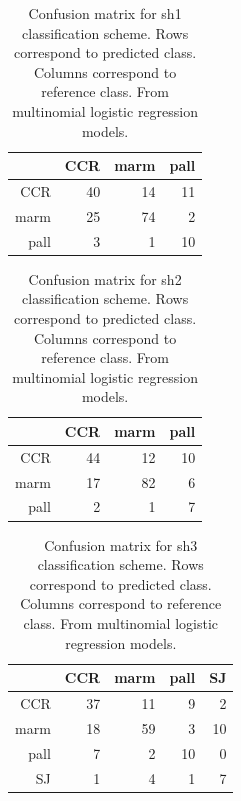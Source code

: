 \documentclass{article}\usepackage{graphicx, color}
\begin{document}
\begin{table}[ht]
\begin{center}
\begin{tabular}{rrrr}
  \hline
 & CCR & marm & pall \\ 
  \hline
CCR &  40 &  14 &  11 \\ 
  marm &  25 &  74 &   2 \\ 
  pall &   3 &   1 &  10 \\ 
   \hline
\end{tabular}
\caption{Confusion matrix for sh1 classification scheme. Rows correspond to predicted class. Columns correspond to reference class. From multinomial logistic regression models.}
\label{tab:multi-conf-sh1}
\end{center}
\end{table}
\begin{table}[ht]
\begin{center}
\begin{tabular}{rrrr}
  \hline
 & CCR & marm & pall \\ 
  \hline
CCR &  44 &  12 &  10 \\ 
  marm &  17 &  82 &   6 \\ 
  pall &   2 &   1 &   7 \\ 
   \hline
\end{tabular}
\caption{Confusion matrix for sh2 classification scheme. Rows correspond to predicted class. Columns correspond to reference class. From multinomial logistic regression models.}
\label{tab:multi-conf-sh2}
\end{center}
\end{table}
\begin{table}[ht]
\begin{center}
\begin{tabular}{rrrrr}
  \hline
 & CCR & marm & pall & SJ \\ 
  \hline
CCR &  37 &  11 &   9 &   2 \\ 
  marm &  18 &  59 &   3 &  10 \\ 
  pall &   7 &   2 &  10 &   0 \\ 
  SJ &   1 &   4 &   1 &   7 \\ 
   \hline
\end{tabular}
\caption{Confusion matrix for sh3 classification scheme. Rows correspond to predicted class. Columns correspond to reference class. From multinomial logistic regression models.}
\label{tab:multi-conf-sh3}
\end{center}
\end{table}
\end{document}
